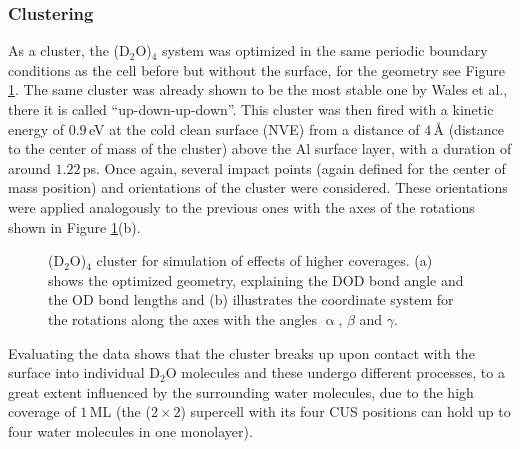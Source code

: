 \documentclass[11pt,DIV=13,BCOR=5mm,a4paper,headinclude]{scrbook}
\begin{document}
\subsubsection{Clustering}\label{clusters}
As a cluster, the (D$_2$O)$_4$ system was optimized in the same periodic boundary conditions as the cell before but without the surface, for the geometry see Figure \ref{abb:D2Ocluster}.
The same cluster was already shown to be the most stable one by Wales et al.\cite{Wales97}, there it is called ``up-down-up-down''.
This cluster was then fired with a kinetic energy of $0.9\,$eV at the cold clean surface (NVE) from a distance of $4\,$\AA{} (distance to the center of mass of the cluster) above the Al surface layer, with a duration of around $1.22\,$ps.
Once again, several impact points (again defined for the center of mass position) and orientations of the cluster were considered.
These orientations were applied analogously to the previous ones with the axes of the rotations shown in Figure \ref{abb:D2Ocluster}(b).
\\
\begin{figure} [!ht]
\centering
  \quad
{}
\caption{(D$_2$O)$_4$ cluster for simulation of effects of higher coverages.
(a) shows the optimized geometry, explaining the DOD bond angle and the OD bond lengths and (b) illustrates the coordinate system for the rotations along the axes with the angles $\upalpha$, $\beta$ and $\gamma$.}
       \label{abb:D2Ocluster}
\end{figure}
Evaluating the data shows that the cluster breaks up upon contact with the surface into individual D$_2$O molecules and these undergo different processes, to a great extent influenced by the surrounding water molecules, due to the high coverage of $1\,$ML (the ($2\times 2$) supercell with its four CUS positions can hold up to four water molecules in one monolayer).
\end{document}
